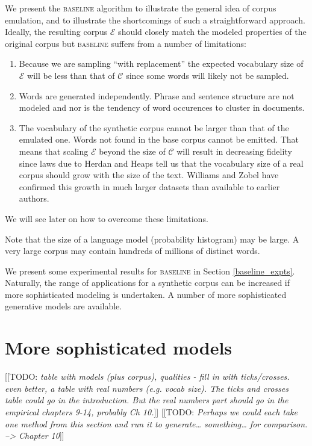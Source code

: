 \documentclass[11pt]{report}
\newcommand{\todo}[1]{{\color{blue}[[TODO: {\emph{#1}}]]}}
\newcommand{\script}[1]{$\mathcal{#1}$}
\begin{document}
We present the \textsc{baseline} algorithm to illustrate the general
idea of corpus emulation, and to illustrate the shortcomings of such a
straightforward approach.  Ideally, the resulting corpus \script{E}
should closely match the modeled properties of the 
original corpus but \textsc{baseline} suffers from a number of limitations:
\begin{enumerate}
\item Because we are sampling ``with replacement'' the expected vocabulary size
  of \script{E} will be less than that of \script{C} since some words
  will likely not be sampled.
\item Words are generated independently.  Phrase and sentence
  structure are not modeled and nor is the tendency of word
  occurences to cluster in documents.
\item The vocabulary of the synthetic corpus cannot be larger than
  that of the emulated one.  Words not found in the base corpus cannot be
  emitted.  That means that scaling \script{E} beyond the size of
  \script{C} will result in decreasing
  fidelity since laws due to Herdan \cite{Herdan1960} and Heaps
  \cite{Heapslaw1978} tell us that
  the vocabulary size of a real corpus should grow with the size of the text.
  Williams and Zobel \cite{williams2005searchable} have confirmed this
  growth in much larger datasets than available to earlier authors.
\end{enumerate}

We will see later on how to overcome these limitations.

Note that the size of a language model (probability histogram) may be
large.  A very large corpus may contain hundreds of millions of
distinct words.

We present some experimental results for \textsc{baseline} in
Section \ref{baseline_expts}.  Naturally, the range of applications for a
synthetic corpus can be increased if more sophisticated modeling is
undertaken.  A number of more sophisticated generative models are
available.

\section{More sophisticated models}

\todo{table with models (plus corpus), qualities - fill in with
  ticks/crosses.   even better, a table with real numbers (e.g. vocab
  size).  The ticks and crosses  table could go in the
  introduction. But the real numbers part should go in the empirical
  chapters 9-14, probably Ch 10.}
\todo{Perhaps we could each take one method from this section and run
  it to generate… something… for comparison.  --> Chapter 10}
\end{document}
